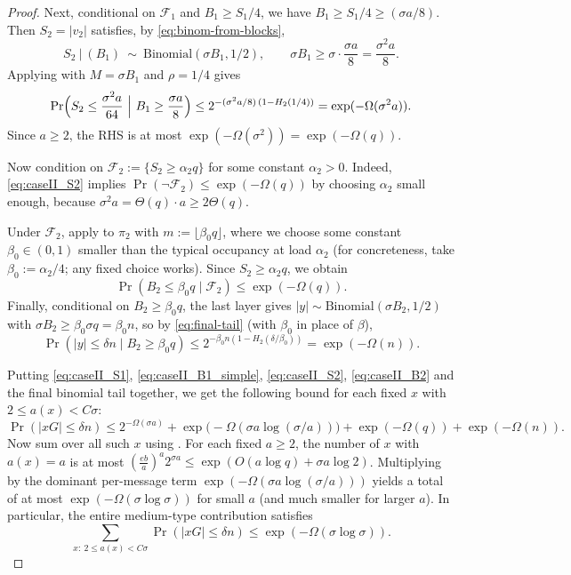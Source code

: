 \begin{proof}
Next, conditional on $\mathcal F_1$ and $B_1\ge S_1/4$, we have $B_1\ge S_1/4\ge (\sigma a/8)$.
Then $S_2=|v_2|$ satisfies, by \eqref{eq:binom-from-blocks},
\[
S_2\ \big|\ (B_1)\ \sim\ \mathrm{Binomial}(\sigma B_1,1/2),
\qquad
\sigma B_1\ge \sigma\cdot\frac{\sigma a}{8}=\frac{\sigma^2 a}{8}.
\]
Applying  with $M=\sigma B_1$ and $\rho=1/4$ gives
\begin{equation}\label{eq:caseII_S2}
\Pr\Bigl(S_2\le \frac{\sigma^2 a}{64}\ \Big|\ B_1\ge \frac{\sigma a}{8}\Bigr)
\le 2^{-(\sigma^2 a/8)\,(1-H_2(1/4))}
=\exp(-\Omega(\sigma^2 a)).
\end{equation}
Since $a\ge 2$, the RHS is at most $\exp(-\Omega(\sigma^2))=\exp(-\Omega(q))$.

Now condition on $\mathcal F_2:=\{S_2\ge \alpha_2 q\}$ for some constant $\alpha_2>0$.
Indeed, \eqref{eq:caseII_S2} implies $\Pr(\neg\mathcal F_2)\le \exp(-\Omega(q))$ by choosing $\alpha_2$ small enough,
because $\sigma^2 a=\Theta(q)\cdot a\ge 2\Theta(q)$.

Under $\mathcal F_2$, apply  to $\pi_2$ with $m:=\lfloor \beta_0 q\rfloor$,
where we choose some constant $\beta_0\in(0,1)$ smaller than the typical occupancy at load $\alpha_2$
(for concreteness, take $\beta_0:=\alpha_2/4$; any fixed choice works).
Since $S_2\ge \alpha_2 q$, we obtain
\begin{equation}\label{eq:caseII_B2}
\Pr(B_2\le \beta_0 q\mid \mathcal F_2)\le \exp(-\Omega(q)).
\end{equation}
Finally, conditional on $B_2\ge \beta_0 q$, the last layer gives
$|y|\sim \mathrm{Binomial}(\sigma B_2,1/2)$ with $\sigma B_2\ge \beta_0\sigma q=\beta_0 n$,
so by \eqref{eq:final-tail} (with $\beta_0$ in place of $\beta$),
\[
\Pr(|y|\le \delta n\mid B_2\ge \beta_0 q)\le 2^{-\beta_0 n(1-H_2(\delta/\beta_0))}=\exp(-\Omega(n)).
\]

Putting \eqref{eq:caseII_S1}, \eqref{eq:caseII_B1_simple}, \eqref{eq:caseII_S2}, \eqref{eq:caseII_B2} and the final binomial tail together,
we get the following bound for each fixed $x$ with $2\le a(x)<C\sigma$:
\[
\Pr(|xG|\le \delta n)
\le 2^{-\Omega(\sigma a)} + \exp\!\bigl(-\Omega(\sigma a\log(\sigma/a))\bigr)+\exp(-\Omega(q))+\exp(-\Omega(n)).
\]
Now sum over all such $x$ using .
For each fixed $a\ge 2$, the number of $x$ with $a(x)=a$ is at most
$\left(\frac{eb}{a}\right)^a 2^{\sigma a}\le \exp(O(a\log q)+\sigma a\log 2)$.
Multiplying by the dominant per-message term $\exp(-\Omega(\sigma a\log(\sigma/a)))$ yields
a total of at most $\exp(-\Omega(\sigma\log\sigma))$ for small $a$
(and much smaller for larger $a$).
In particular, the entire medium-type contribution satisfies
\begin{equation}\label{eq:caseII_total}
\sum_{x:\ 2\le a(x)<C\sigma}\Pr(|xG|\le \delta n)\le \exp(-\Omega(\sigma\log\sigma)).
\end{equation}


\end{proof}
